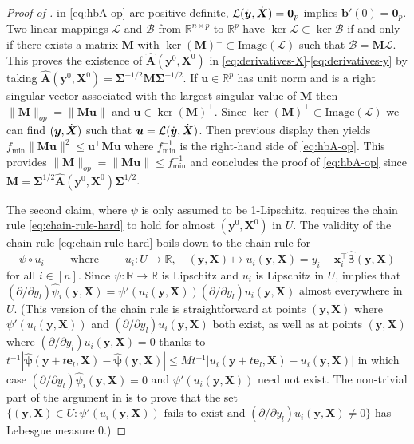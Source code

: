 \documentclass[11pt]{amsart}
\numberwithin{equation}{section}
\numberwithin{equation}{section}
\def\real{{\mathbb{R}}}
\def\R{{\real}}
\def\mathbold{\boldsymbol} %
\def\bA{\mathbold{A}}\def\calA{{\cal A}}\def\scrA{{\mathscr A}}\def\Ahat{\widehat{A}}\def\Atil{{\widetilde A}}
\def\hbA{{\widehat{\bA}}}\def\tbA{{\widetilde{\bA}}}
\def\bb{\mathbold{b}}\def\bhat{\widehat{b}}\def\btil{\widetilde{b}}
\def\bM{\mathbold{M}}\def\hbM{{\widehat{\bM}}}\def\tbM{{\widetilde{\bM}}}
\def\be{\mathbold{e}}
\def\bu{\mathbold{u}}\def\uhat{\widehat{u}}\def\util{\widetilde{u}}\def\ubar{{\overline u}}
\def\bx{\mathbold{x}}\def\xhat{\widehat{x}}\def\xtil{\widetilde{x}}\def\xbar{{\overline x}}\def\vbx{{\bf x}}
\def\bX{\mathbold{X}}\def\hbX{{\widehat{\bX}}}\def\tbX{{\widetilde{\bX}}}\def\bXbar{{\overline \bX}}
\def\by{\mathbold{y}}\def\yhat{\widehat{y}}\def\ytil{\widetilde{y}}\def\ybar{{\overline y}}\def\vby{{\bf y}}
\def\bbeta{\mathbold{\beta}}\def\betahat{\widehat{\beta}}\def\hbeta{\widehat{\beta}}
\def\hbbeta{{{\widehat{\bbeta}}}}
\def\bSigma{\mathbold{\Sigma}}\def\hbSigma{{\widehat{\bSigma}}}
\def\bpsi{\mathbold{\psi}}\def\psihat{\widehat{\psi}}\def\hpsi{\widehat{\psi}}
\def\hbpsi{{\widehat{\bpsi}}}\def\tbpsi{{\widetilde{\bpsi}}}
\begin{document}
\begin{proof}[Proof of ]
    in \eqref{eq:hbA-op} are positive definite,
    $\mathcal L(\dy,\dX) = \mathbf 0_p$ implies $\bb'(0)=\mathbf 0_{p}$.
    Two linear mappings $\mathcal L$ and $\mathcal B$ from $\R^{n\times p}$
    to $\R^p$ have $\ker \mathcal L\subset\ker \mathcal B$ if and only
    if there exists a matrix $\bM$ with $\ker(\bM)^\perp\subset\text{Image}(\mathcal L)$ such that
    $\mathcal B = \bM \mathcal L$. This proves the existence of
    $\hbA(\by^0,\bX^0)$ in \eqref{eq:derivatives-X}-\eqref{eq:derivatives-y}
    by taking $\hbA(\by^0,\bX^0) = \bSigma^{-1/2}\bM\bSigma^{-1/2}$.
    If $\bu\in\R^p$ has unit norm and is a right singular vector associated with
    the largest singular value of $\bM$ then
    $\|\bM\|_{op} = \|\bM \bu\|$ and $\bu\in\ker(\bM)^\perp$. Since
    $\ker(\bM)^\perp\subset\text{Image}(\mathcal L)$ we can find
    $(\by,\dX)$ such that $\bu=\mathcal L(\dy,\dX)$. Then previous display
    then yields
    $f_{\min}\|\bM\bu\|^2 \le \bu^\top \bM \bu$ where
    $f_{\min}^{-1}$ is the right-hand side of \eqref{eq:hbA-op}.
    This provides $\|\bM\|_{op} = \|\bM\bu\| \le f_{\min}^{-1}$
    and concludes the proof of \eqref{eq:hbA-op}
    since $\bM=\bSigma^{1/2}\hbA{}(\by^0,\bX^0)\bSigma^{1/2}$.


The second claim, where $\psi$ is only assumed to be 1-Lipschitz, requires
the chain rule \eqref{eq:chain-rule-hard} to hold
for almost $(\by^0,\bX^0)$ in $U$.
    The validity of the chain rule \eqref{eq:chain-rule-hard} boils
    down to the chain rule
    for 
    $$\psi\circ u_i\qquad\text{ where }
    \qquad u_i:U \to \R,
    \quad
    (\by,\bX)\mapsto u_i(\by,\bX)= y_i - \bx_i^\top\hbbeta(\by,\bX)
    $$
    for all $i\in[n]$. 
    Since $\psi:\R\to\R$ is Lipschitz and $u_i$ is Lipschitz in $U$,
    \cite[Theorem 2.1.11]{ziemer2012weakly} implies that
    $(\partial/\partial y_l)\hpsi_i(\by,\bX) = \psi'(u_i(\by,\bX))
    (\partial/\partial y_l)u_i(\by,\bX)$
    almost everywhere in $U$.
    (This version of the chain rule is straightforward 
    at points $(\by,\bX)$ where
    $\psi'(u_i(\by,\bX))$ and $(\partial/\partial y_l)u_i(\by,\bX)$
    both exist,
    as well as at points $(\by,\bX)$ where 
    $(\partial/\partial y_l)u_i(\by,\bX) = 0$ thanks
    to
    $t^{-1}|\hbpsi(\by+t\be_l,\bX) - \hbpsi(\by,\bX)|
    \le M t^{-1} |u_i(\by+t\be_l,\bX)  - u_i(\by,\bX)|$
    in which case
    $(\partial/\partial y_l)\hpsi_i(\by,\bX)=0$
    and $\psi'(u_i(\by,\bX))$ need not exist.
    The non-trivial part of the argument
    in
    \cite[Theorem 2.1.11]{ziemer2012weakly}
    is to prove
    that the set $\{(\by,\bX)\in U:
        \psi'(u_i(\by,\bX)) \text{ fails to exist and }
        (\partial/\partial y_l)u_i(\by,\bX) \ne 0
    \}$ has Lebesgue measure 0.)
\end{proof}
\end{document}
